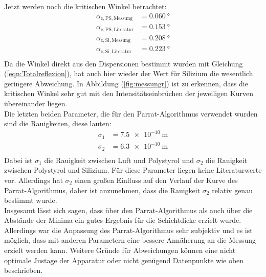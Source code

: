 \noindent Jetzt werden noch die kritischen Winkel betrachtet:
\begin{align*}
  \alpha_\mathrm{c,PS,Messung}&=\SI{0.060}{\degree} \\
  \alpha_\mathrm{c,PS,Literatur}&=\SI{0.153}{\degree} \\
  \alpha_\mathrm{c,Si,Messung}&=\SI{0.208}{\degree} \\
  \alpha_\mathrm{c,Si,Literatur}&=\SI{0.223}{\degree} \\
\end{align*}
Da die Winkel direkt aus den Dispersionen bestimmt wurden mit Gleichung (\ref{eqn:Totalreflexion}), hat auch hier wieder der Wert für Silizium die wesentlich geringere Abweichung.
In Abbildung (\ref{fig:messungr}) ist zu erkennen, dass die kritischen Winkel sehr gut mit den Intensitätseinbrüchen der jeweiligen Kurven übereinander liegen. \\

\noindent Die letzten beiden Parameter, die für den Parrat-Algorithmus verwendet wurden sind die Rauigkeiten, diese lauten:
\begin{align*}
  \sigma_\mathrm{1} &=\SI{7.5 e-10}{\meter} \\
  \sigma_\mathrm{2} &=\SI{6.3 e-10}{\meter} \\
\end{align*}
Dabei ist $\sigma_\mathrm{1}$ die Rauigkeit zwischen Luft und Polystyrol und $\sigma_\mathrm{2}$ die Rauigkeit zwischen Polystyrol und Silizium. Für diese Parameter liegen
keine Literaturwerte vor. Allerdings hat $\sigma_\mathrm{2}$ einen großen Einfluss auf den Verlauf der Kurve des Parrat-Algorithmus, daher ist anzunehmen, dass die
Rauigkeit $\sigma_\mathrm{2}$ relativ genau bestimmt wurde.\\

Insgesamt lässt sich sagen, dass über den Parrat-Algorithmus als auch über die Abstände der Minima ein gutes Ergebnis für die Schichtdicke erzielt wurde. Allerdings
war die Anpassung des Parrat-Algorithmus sehr subjektiv und es ist möglich, dass mit anderen Parametern eine bessere Annäherung an die Messung erzielt werden kann.
Weitere Gründe für Abweichungen können eine nicht optimale Justage der Apparatur oder nicht genügend Datenpunkte wie oben beschrieben.
